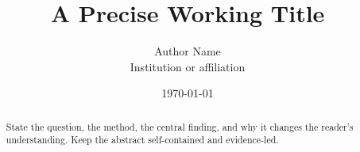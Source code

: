 \documentclass[11pt]{article}
\title{A Precise Working Title}
\author{Author Name\\\small Institution or affiliation}
\date{\today}
\begin{document}
\maketitle

\begin{abstract}
State the question, the method, the central finding, and why it changes the
reader's understanding. Keep the abstract self-contained and evidence-led.
\end{abstract}





% 
% 
\end{document}
